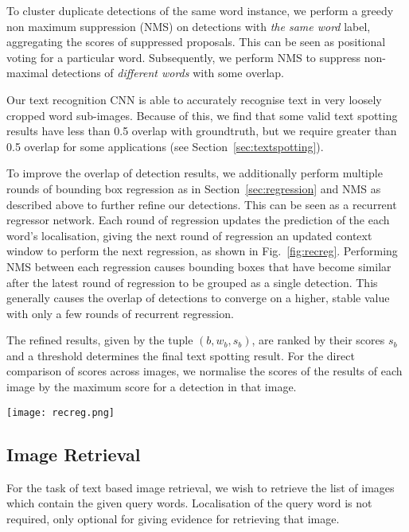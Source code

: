 \documentclass[twocolumn]{svjour3}          \smartqed  \usepackage{epsfig}
\begin{document}
To cluster duplicate detections of the same word instance, we perform a greedy non maximum suppression (NMS) on detections with \emph{the same word} label, aggregating the scores of suppressed proposals. This can be seen as positional voting for a particular word. Subsequently, we perform NMS to suppress non-maximal detections of \emph{different words} with some overlap.

Our text recognition CNN is able to accurately recognise text in very loosely cropped word sub-images. Because of this, we find that some valid text spotting results have less than 0.5 overlap with groundtruth, but we require greater than 0.5 overlap for some applications (see Section~\ref{sec:textspotting}). 

To improve the overlap of detection results, we additionally perform multiple rounds of bounding box regression as in Section~\ref{sec:regression} and NMS as described above to further refine our detections. This can be seen as a recurrent regressor network. Each round of regression updates the prediction of the each word's localisation, giving the next round of regression an updated context window to perform the next regression, as shown in Fig.~\ref{fig:recreg}. Performing NMS between each regression causes bounding boxes that have become similar after the latest round of regression to be grouped as a single detection. This generally causes the overlap of detections to converge on a higher, stable value with only a few rounds of recurrent regression.

The refined results, given by the tuple $(b, w_b, s_b)$, are ranked by their scores $s_b$ and a threshold determines the final text spotting result. For the direct comparison of scores across images, we normalise the scores of the results of each image by the maximum score for a detection in that image.

\begin{figure*}
\begin{center}
\texttt{[image: recreg.png]} 
\caption{An example of the improvement in localisation of the word detection \texttt{pharmacy} through multiple rounds of recurrent regression.}
\label{fig:recreg}
\end{center}
\end{figure*}

\subsection{Image Retrieval}
For the task of text based image retrieval, we wish to retrieve the list of images which contain the given query words. Localisation of the query word is not required, only optional for giving evidence for retrieving that image. 
\end{document}
